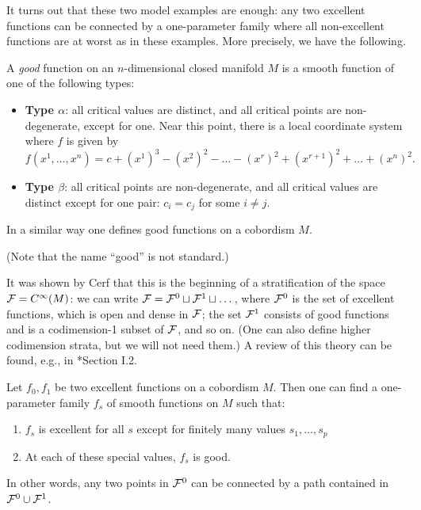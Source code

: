 It turns out that these two model examples are enough: any two excellent
functions can be connected by a one-parameter family where all non-excellent
functions are at worst as in these examples. More precisely, we have the
following.

\begin{definition}\label{d:morse-good}
  A \emph{good} function on an $n$-dimensional closed manifold $M$ is a
  smooth function of one of the following types:
  \begin{itemize}
    \item {\bf Type $\alpha$}: all critical values are distinct, and all
      critical points are non-degenerate, except for one. Near this point,
      there is a local coordinate system where $f$ is given by
      $$
      f(x^1, \dots, x^n)=c+(x^1)^3 -(x^2)^2-\dots -(x^r)^2+(x^{r+1})^2 +
                        \dots +(x^n)^2.
      $$
    \item {\bf Type $\beta$}: all critical points are non-degenerate, and
      all critical values are distinct except for one pair: $c_i = c_j$
      for some $i\ne j$.
  \end{itemize}
  In a similar way one defines good functions on a cobordism $M$.
\end{definition}

(Note that the name ``good'' is not standard.)

It was shown by Cerf that this is the beginning of a stratification of the
space $\mathcal{F}=C^\infty(M)$: we can write
$\mathcal{F} = \mathcal{F}^0\sqcup \mathcal{F}^1\sqcup\dots$,
where $\mathcal{F}^0$ is the set of excellent functions, which is open and dense in
$\mathcal{F}$; the set $\mathcal{F}^1$ consists of good functions and is a codimension-1
subset of $\mathcal{F}$, and so on. (One can also define higher codimension strata,
but we will not need them.) A review of this theory can be found, e.g., in
*{Section I.2}.

\begin{theorem}\label{t:cerf1}
  Let $f_0, f_1$ be two excellent functions on a cobordism $M$. Then one can
  find a one-parameter family $f_s$ of smooth functions on $M$ such that:
  \begin{enumerate}
    \item $f_s$ is excellent for all $s$ except for finitely
      many values $s_1, \dots, s_p$
    \item At each of these special values, $f_s$ is good.
  \end{enumerate}
\end{theorem}
In other words, any two points in $\mathcal{F}^0$ can be connected by a path
contained in $\mathcal{F}^0\cup \mathcal{F}^1$.

